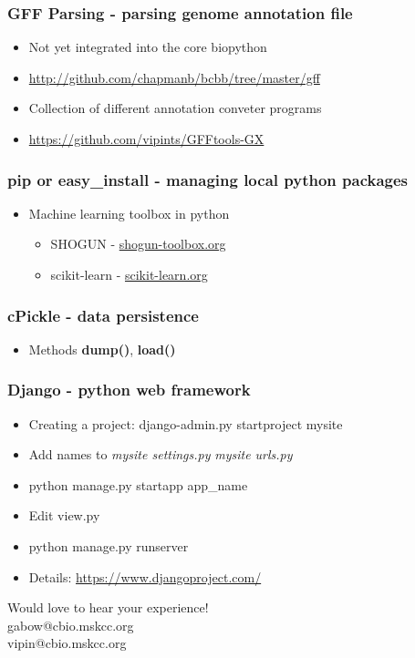 \documentclass[11pt]{beamer}
\makeatletter
\newcommand{\thankyou}
{\begin{center} Would love to hear your experience! \\  gabow@cbio.mskcc.org \\ vipin@cbio.mskcc.org \end{center}}
\makeatother
\begin{document}
%
\begin{frame}[plain]
    \frametitle{GFF Parsing - parsing genome annotation file}
    \begin{itemize}
        \item[] Not yet integrated into the core biopython  
        \item[] \url{http://github.com/chapmanb/bcbb/tree/master/gff}  
        \newline
        \pause
        \item[] Collection of different annotation conveter programs 
        \item[] \url{https://github.com/vipints/GFFtools-GX} 
    \end{itemize}
\end{frame}
%
\begin{frame}[plain]
    \frametitle{\textbf{pip} or \textbf{easy\_install} - managing local python packages}
    \begin{itemize}
        \item[] Machine learning toolbox in python
        \begin{itemize}
            \item []SHOGUN - \url{shogun-toolbox.org}
            \item []scikit-learn - \url{scikit-learn.org} 
        \pause
        \end{itemize}
        
    \end{itemize}
\end{frame}
%
\begin{frame}[plain]
    \frametitle{\textbf{cPickle} - data persistence}
    \begin{itemize}
        \item[] Methods \textbf{dump()}, \textbf{load()} 
        \newline
        \pause
        
        \pause
        
    \end{itemize}
\end{frame}
%
\begin{frame}[plain]
    \frametitle{\textbf{Django} - python web framework}
    \begin{itemize}
        \item[] Creating a project: django-admin.py startproject mysite 
        \newline
        \pause 
        \item[] Add names to \textit{mysite settings.py} \textit{mysite urls.py} 
        \pause 
        \item[] python manage.py startapp app\_name
        \pause 
        \item[] Edit view.py 
        
        \pause 
        \item[] python manage.py runserver
        \item[] Details: \url{https://www.djangoproject.com/}
    \end{itemize}
\end{frame}
%
\begin{frame}[plain]
    \thankyou
\end{frame}
\end{document}
